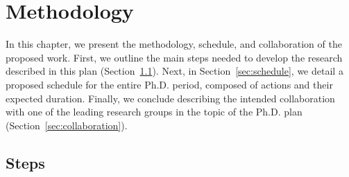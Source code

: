 \chapter{Methodology}\label{cap:methodology}
\thispagestyle{empty}

In this chapter, we present the methodology, schedule, and collaboration of the proposed work. First, we outline the main steps needed to develop the research described in this plan (Section~\ref{sec:steps}). Next, in Section~\ref{sec:schedule}, we detail a proposed schedule for the entire Ph.D. period, composed of actions and their expected duration. Finally, we conclude describing the intended collaboration with one of the leading research groups in the topic of the Ph.D. plan (Section~\ref{sec:collaboration}). 

\section{Steps}
\label{sec:steps}

